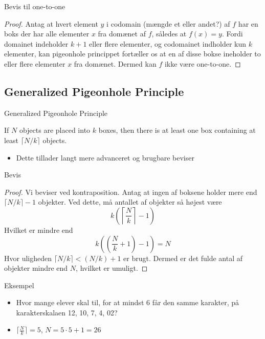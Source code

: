 \documentclass{beamer}
\begin{document}
\begin{frame}{Bevis til one-to-one}
    \begin{proof}
        Antag at hvert element $y$ i codomain (mængde et eller andet?) af $f$ har en boks der har alle elementer $x$ fra domænet af $f$, således at $f(x) = y$. Fordi domainet indeholder $k+1$ eller flere elementer, og codomainet indholder kun $k$ elementer, kan pigeonhole princippet fortæller os at en af disse bokse ineholder to eller flere elementer $x$ fra domænet. Dermed kan $f$ ikke være one-to-one.
    \end{proof} 
\end{frame}

\subsection{Generalized Pigeonhole Principle}

\begin{frame}{Generalized Pigeonhole Principle}
\begin{theorem}
If $N$ objects are placed into $k$ boxes, then there is at least one box containing at least $\lceil N/k \rceil$  objects.
\end{theorem}
    \begin{itemize}
        \item Dette tillader langt mere advanceret og brugbare beviser
    \end{itemize}
\end{frame}

\begin{frame}{Bevis}
   \begin{proof}
       Vi beviser ved kontraposition. Antag at ingen af boksene holder mere end $\lceil N / k \rceil - 1$ objekter. Ved dette, må antallet af objekter så højest være
       $$k \left ( \left \lceil \frac{N}{k} \right \rceil - 1\right )$$
       Hvilket er mindre end
       $$k \left ( \left ( \frac{N}{k}+1 \right )-1 \right ) = N$$
       Hvor uligheden $\lceil N/k \rceil  < (N/k) + 1$ er brugt. Dermed er det fulde antal af objekter mindre end $N$, hvilket er umuligt.
   \end{proof} 
\end{frame}

\begin{frame}{Eksempel}
   \begin{itemize}
       \item<1-> Hvor mange elever skal til, for at mindst 6 får den samme karakter, på karakterskalaen 12, 10, 7, 4, 02? 
       \item<2-> $\lceil\frac{N}{k}\rceil = 5$, $N = 5 \cdot 5 + 1 = 26$
   \end{itemize} 
\end{frame}
\end{document}
